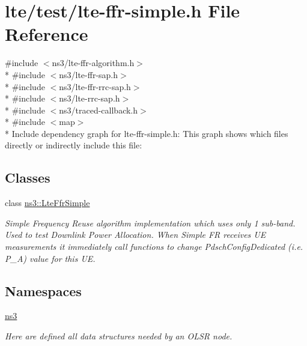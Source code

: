 \hypertarget{lte-ffr-simple_8h}{}\section{lte/test/lte-\/ffr-\/simple.h File Reference}
\label{lte-ffr-simple_8h}
{\ttfamily \#include $<$ns3/lte-\/ffr-\/algorithm.\+h$>$}\\*
{\ttfamily \#include $<$ns3/lte-\/ffr-\/sap.\+h$>$}\\*
{\ttfamily \#include $<$ns3/lte-\/ffr-\/rrc-\/sap.\+h$>$}\\*
{\ttfamily \#include $<$ns3/lte-\/rrc-\/sap.\+h$>$}\\*
{\ttfamily \#include $<$ns3/traced-\/callback.\+h$>$}\\*
{\ttfamily \#include $<$map$>$}\\*
Include dependency graph for lte-\/ffr-\/simple.h\+:
This graph shows which files directly or indirectly include this file\+:
\subsection*{Classes}
\begin{DoxyCompactItemize}
\item 
class \hyperlink{classns3_1_1LteFfrSimple}{ns3\+::\+Lte\+Ffr\+Simple}
\begin{DoxyCompactList}\small\item\em Simple Frequency Reuse algorithm implementation which uses only 1 sub-\/band. Used to test Downlink Power Allocation. When Simple FR receives UE measurements it immediately call functions to change Pdsch\+Config\+Dedicated (i.\+e. P\+\_\+A) value for this UE. \end{DoxyCompactList}\end{DoxyCompactItemize}
\subsection*{Namespaces}
\begin{DoxyCompactItemize}
\item 
 \hyperlink{namespacens3}{ns3}
\begin{DoxyCompactList}\small\item\em Here are defined all data structures needed by an O\+L\+SR node. \end{DoxyCompactList}\end{DoxyCompactItemize}
